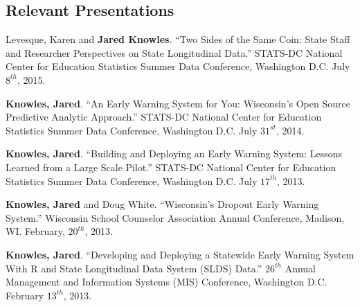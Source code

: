 \documentclass[margin,line]{res}
\begin{document}
\begin{resume}
\section{\sc Relevant Presentations}

Levesque, Karen and \textbf{Jared Knowles}. ``Two Sides of the Same Coin: State 
Staff and Researcher Perspectives on State Longitudinal Data.'' STATS-DC National Center for Education Statistics Summer Data Conference, Washington D.C. July $8^{th}$, 2015.


\textbf{Knowles, Jared}. ``An Early Warning System for You: Wisconsin’s Open Source Predictive Analytic Approach.'' STATS-DC National Center for Education Statistics Summer Data Conference, Washington D.C. July $31^{st}$, 2014.


\textbf{Knowles, Jared}. ``Building and Deploying an Early Warning System: Lessons Learned from a Large Scale Pilot.'' STATS-DC National Center for Education Statistics Summer Data Conference, Washington D.C. July $17^{th}$, 2013.

% 
\textbf{Knowles, Jared} and Doug White. ``Wisconsin's Dropout Early Warning System.'' Wisconsin School Counselor Association Annual Conference, Madison, WI. February, $20^{th}$, 2013. 


\textbf{Knowles, Jared}. ``Developing and Deploying a Statewide Early Warning System With R and State Longitudinal Data System (SLDS) Data.'' $26^{th}$ Annual Management and Information Systems (MIS) Conference, Washington D.C. February $13^{th}$, 2013.


\end{resume}
\end{document}
